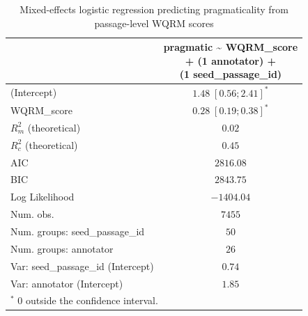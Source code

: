 
\usepackage{booktabs}

\begin{table}[htbp]
\begin{center}
\begin{tabular}{l c}
\toprule
 & \shortstack[l]{pragmatic \textasciitilde{} WQRM\_score  \\ 
+ (1 \textbar{} annotator) + \\ 
(1 \textbar{} seed\_passage\_id)} \\
\midrule
(Intercept)                        & $1.48 \; [0.56; 2.41]^{*}$ \\
WQRM\_score                        & $0.28 \; [0.19; 0.38]^{*}$ \\
\midrule
$R^2_m$ (theoretical)              & $0.02$                     \\
$R^2_c$ (theoretical)              & $0.45$                     \\
AIC                                & $2816.08$                  \\
BIC                                & $2843.75$                  \\
Log Likelihood                     & $-1404.04$                 \\
Num. obs.                          & $7455$                     \\
Num. groups: seed\_passage\_id     & $50$                       \\
Num. groups: annotator             & $26$                       \\
Var: seed\_passage\_id (Intercept) & $0.74$                     \\
Var: annotator (Intercept)         & $1.85$                     \\
\bottomrule
\multicolumn{2}{l}{\scriptsize{$^*$ 0 outside the confidence interval.}}
\end{tabular}
\caption{Mixed-effects logistic regression predicting pragmaticality from passage-level WQRM scores}
\label{tab:glmer_prag_wqrm}
\end{center}
\end{table}
